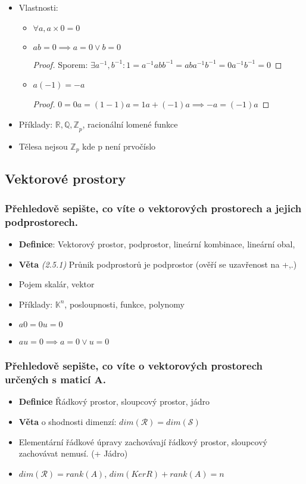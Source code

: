 \documentclass[10pt,a4paper]{article}
\begin{document}
{\begin{itemize}[label=$\circ$]
\item Vlastnosti: \begin{itemize}
\item $\forall a, a \times 0 = 0$
\item $ab = 0 \implies a = 0 \vee b = 0$ \begin{proof}
Sporem: $\exists a^{-1}, b^{-1}: 1 = a^{-1}abb^{-1}= aba^{-1}b^{-1} = 0a^{-1}b^{-1} = 0$
\end{proof}
\item $a (-1) = -a$ \begin{proof}
$0 = 0a = (1-1)a = 1a + (-1)a \implies -a = (-1)a$
\end{proof}
\end{itemize}
\item Příklady: $\mathbb{R, Q, Z}_p$, racionální lomené funkce
\item Tělesa nejsou $\mathbb{Z}_p$ kde p není prvočíslo
\end{itemize}

\subsection{Vektorové prostory}
\subsubsection{Přehledově sepište, co víte o vektorových prostorech a jejich podprostorech.}

\begin{itemize}[label=$\circ$]
    \item \textbf{Definice}: Vektorový prostor, podprostor, lineární kombinace, lineární obal, 
    \item \textbf{Věta} \textit{(2.5.1)} Průnik podprostorů je podprostor (ověří se uzavřenost na +,.) 
\item Pojem skalár, vektor
\item Příklady: $\mathbb{K}^n$, posloupnosti, funkce, polynomy
\item $a0 = 0u = 0$
\item $a u = 0 \implies a = 0 \vee u = 0$
\end{itemize}

\subsubsection{Přehledově sepište, co víte o vektorových prostorech určených s maticí A.}

\begin{itemize}[label=$\circ$]
    \item \textbf{Definice} Řádkový prostor, sloupcový prostor, jádro 
    \item \textbf{Věta} o shodnosti dimenzí: $ dim(\mathcal{R}) = dim(\mathcal{S})$
    \item Elementární řádkové úpravy zachovávají řádkový prostor, sloupcový zachovávat nemusí. (+ Jádro)
\item $dim(\mathcal{R}) = rank(A)$, $dim(Ker{R}) + rank(A) = n$
\end{itemize}

}
\end{document}
